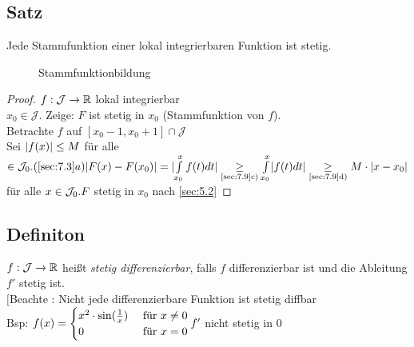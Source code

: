 \subsection[Satz]{Satz}
Jede Stammfunktion einer lokal integrierbaren Funktion ist stetig.
\begin{figure}[h!]
\centering
{}
\caption{Stammfunktionbildung}
\end{figure}
\begin{proof}
$f: \mathcal{J} \to \mathbb{R}$ lokal integrierbar\\
$x_0 \in \mathcal{J}$. Zeige: $F$ ist stetig in $x_0$ (Stammfunktion von $f$).\\
Betrachte $f$ auf $[x_0-1,x_0+1]\cap \mathcal{J}$\\
Sei $\lvert f(x) \rvert \le M$ für alle $ \in \mathcal{J}_0. (\ref{sec:7.3}a)\\
\lvert F(x) - F(x_0) \rvert = \lvert \int\limits_{x_0}^{x} f(t)dt \rvert \underset{\text{\ref{sec:7.9}c)}}{\ge} \int\limits_{x_0}^{x} \lvert f(t)dt \rvert \underset{\text{\ref{sec:7.9}d)}}{\ge} M \cdot \lvert x-x_0 \rvert$ für alle $x\in \mathcal{J}_0.\\ F$ stetig in $x_0$ nach \ref{sec:5.2}
\end{proof}
\subsection{Definiton}
$f: \mathcal{J} \to \mathbb{R}$ hei\ss t \emph{stetig differenzierbar}, falls $f$ differenzierbar ist und die Ableitung $f'$ stetig ist.\\
$[$Beachte : Nicht jede differenzierbare Funktion ist stetig diffbar\\
Bsp: $f(x) = \begin{cases}
x^2 \cdot \sin(\frac{1}{x}) & \text{ für } x \ne 0\\
0 & \text{ für } x = 0
\end{cases}\\
f'$ nicht stetig in 0
